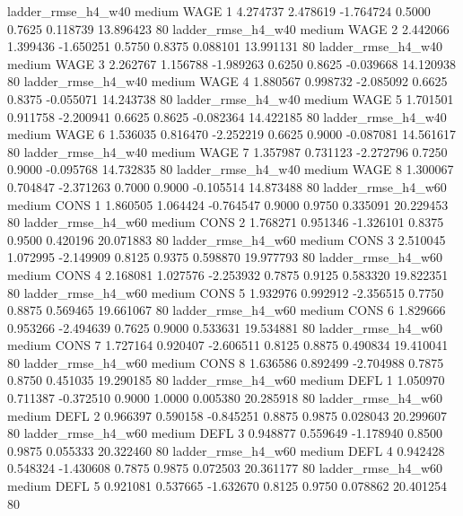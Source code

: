     ladder_rmse_h4_w40     medium     WAGE                 1  4.274737 2.478619 -1.764724 0.5000 0.7625  0.118739   13.896423 80
    ladder_rmse_h4_w40     medium     WAGE                 2  2.442066 1.399436 -1.650251 0.5750 0.8375  0.088101   13.991131 80
    ladder_rmse_h4_w40     medium     WAGE                 3  2.262767 1.156788 -1.989263 0.6250 0.8625 -0.039668   14.120938 80
    ladder_rmse_h4_w40     medium     WAGE                 4  1.880567 0.998732 -2.085092 0.6625 0.8375 -0.055071   14.243738 80
    ladder_rmse_h4_w40     medium     WAGE                 5  1.701501 0.911758 -2.200941 0.6625 0.8625 -0.082364   14.422185 80
    ladder_rmse_h4_w40     medium     WAGE                 6  1.536035 0.816470 -2.252219 0.6625 0.9000 -0.087081   14.561617 80
    ladder_rmse_h4_w40     medium     WAGE                 7  1.357987 0.731123 -2.272796 0.7250 0.9000 -0.095768   14.732835 80
    ladder_rmse_h4_w40     medium     WAGE                 8  1.300067 0.704847 -2.371263 0.7000 0.9000 -0.105514   14.873488 80
    ladder_rmse_h4_w60     medium     CONS                 1  1.860505 1.064424 -0.764547 0.9000 0.9750  0.335091   20.229453 80
    ladder_rmse_h4_w60     medium     CONS                 2  1.768271 0.951346 -1.326101 0.8375 0.9500  0.420196   20.071883 80
    ladder_rmse_h4_w60     medium     CONS                 3  2.510045 1.072995 -2.149909 0.8125 0.9375  0.598870   19.977793 80
    ladder_rmse_h4_w60     medium     CONS                 4  2.168081 1.027576 -2.253932 0.7875 0.9125  0.583320   19.822351 80
    ladder_rmse_h4_w60     medium     CONS                 5  1.932976 0.992912 -2.356515 0.7750 0.8875  0.569465   19.661067 80
    ladder_rmse_h4_w60     medium     CONS                 6  1.829666 0.953266 -2.494639 0.7625 0.9000  0.533631   19.534881 80
    ladder_rmse_h4_w60     medium     CONS                 7  1.727164 0.920407 -2.606511 0.8125 0.8875  0.490834   19.410041 80
    ladder_rmse_h4_w60     medium     CONS                 8  1.636586 0.892499 -2.704988 0.7875 0.8750  0.451035   19.290185 80
    ladder_rmse_h4_w60     medium     DEFL                 1  1.050970 0.711387 -0.372510 0.9000 1.0000  0.005380   20.285918 80
    ladder_rmse_h4_w60     medium     DEFL                 2  0.966397 0.590158 -0.845251 0.8875 0.9875  0.028043   20.299607 80
    ladder_rmse_h4_w60     medium     DEFL                 3  0.948877 0.559649 -1.178940 0.8500 0.9875  0.055333   20.322460 80
    ladder_rmse_h4_w60     medium     DEFL                 4  0.942428 0.548324 -1.430608 0.7875 0.9875  0.072503   20.361177 80
    ladder_rmse_h4_w60     medium     DEFL                 5  0.921081 0.537665 -1.632670 0.8125 0.9750  0.078862   20.401254 80

